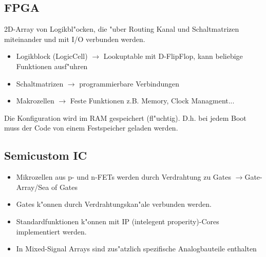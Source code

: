 \subsection{FPGA}
2D-Array von Logikbl"ocken, die "uber Routing Kanal und Schaltmatrizen miteinander und mit I/O verbunden werden.\\
\begin{itemize}
	\setlength{\itemsep}{1pt}
  \setlength{\parskip}{0pt}
  \setlength{\parsep}{0pt}
  
	\item Logikblock (LogicCell) $\rightarrow$ Lookuptable mit D-FlipFlop, kann beliebige Funktionen ausf"uhren
	\item Schaltmatrizen $\rightarrow$ programmierbare Verbindungen
	\item Makrozellen $\rightarrow$ Feste Funktionen z.B. Memory, Clock Managment...
\end{itemize}
Die Konfiguration wird im RAM gespeichert (fl"uchtig). D.h. bei jedem Boot muss der Code von einem Festspeicher geladen werden.\\

%
%


\subsection{Semicustom IC}
\begin{itemize}
	\setlength{\itemsep}{1pt}
  \setlength{\parskip}{0pt}
  \setlength{\parsep}{0pt}
  
	\item Mikrozellen aus p- und n-FETs werden durch Verdrahtung zu Gates 			
		$\rightarrow$Gate-Array/Sea of Gates\\
	\item Gates k"onnen durch Verdrahtungskan"ale verbunden werden.\\
	\item Standardfunktionen k"onnen mit IP (intelegent properity)-Cores implementiert werden.\\
	\item In Mixed-Signal Arrays sind zus"atzlich spezifische Analogbauteile enthalten\\
\end{itemize}	
	
